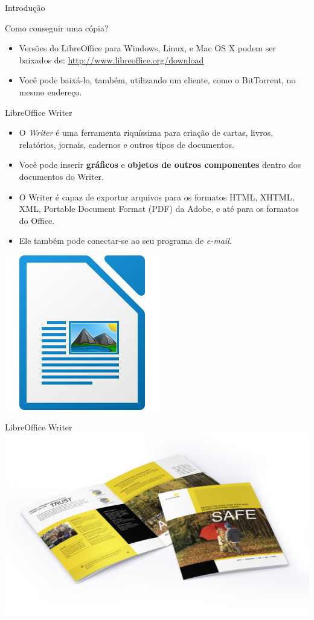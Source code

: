 \begin{frame}{Introdução}
	\begin{block}{Como conseguir uma cópia?}
		\begin{itemize}
			\item Versões do LibreOffice para Windows, Linux, e Mac OS X podem ser baixados de: \url{http://www.libreoffice.org/download}
			\item Você pode baixá-lo, também, utilizando um cliente, como o BitTorrent, no mesmo endereço.
		\end{itemize}
	\end{block}

\end{frame}


\begin{frame}{LibreOffice Writer}
	\begin{block}{}
		\begin{itemize}
			\item O \textit{Writer} é uma ferramenta riquíssima para criação de cartas, livros, relatórios, jornais, cadernos e outros tipos de documentos.
			\item Você pode inserir \textbf{gráficos} e \textbf{objetos de outros componentes} dentro dos documentos do Writer.
			\item O Writer é capaz de exportar arquivos para os formatos HTML, XHTML, XML, Portable Document Format (PDF) da Adobe, e até para os formatos do Office.
			\item Ele também pode conectar-se ao seu programa de \textit{e-mail}.
		\end{itemize}
	\end{block}

	\centering
	\includegraphics[width=0.25\linewidth]{Figuras/Ch04/fig1}
\end{frame}


\begin{frame}{LibreOffice Writer}
	\centering
	\includegraphics[width=1\linewidth]{Figuras/Ch04/fig0}
\end{frame}



